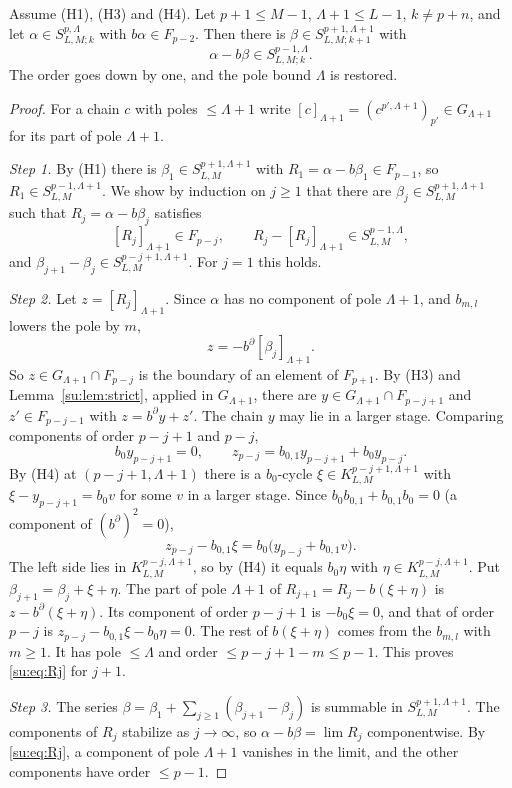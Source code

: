 \begin{proposition}
\label{su:prop:step}
Assume (H1), (H3) and (H4). Let \(p+1\le M-1\), \(\Lambda+1\le L-1\),
\(k\ne p+n\), and let \(\alpha\in S^{p,\Lambda}_{L,M;k}\) with
\(b\alpha\in F_{p-2}\). Then there is \(\beta\in
S^{p+1,\Lambda+1}_{L,M;k+1}\) with
\[
 \alpha-b\beta\in S^{p-1,\Lambda}_{L,M;k}.
\]
The order goes down by one, and the pole bound \(\Lambda\) is restored.
\end{proposition}

\begin{proof}
For a chain \(c\) with poles \(\le\Lambda+1\) write \([c]_{\Lambda+1}=
(c^{p',\Lambda+1})_{p'}\in G_{\Lambda+1}\) for its part of pole
\(\Lambda+1\).

\emph{Step 1.} By (H1) there is \(\beta_1\in S^{p+1,\Lambda+1}_{L,M}\)
with \(R_1=\alpha-b\beta_1\in F_{p-1}\), so \(R_1\in
S^{p-1,\Lambda+1}_{L,M}\). We show by induction on \(j\ge1\) that there
are \(\beta_j\in S^{p+1,\Lambda+1}_{L,M}\) such that
\(R_j=\alpha-b\beta_j\) satisfies
\begin{equation}\label{su:eq:Rj}
 [R_j]_{\Lambda+1}\in F_{p-j},\qquad R_j-[R_j]_{\Lambda+1}\in
 S^{p-1,\Lambda}_{L,M},
\end{equation}
and \(\beta_{j+1}-\beta_j\in S^{p-j+1,\Lambda+1}_{L,M}\). For \(j=1\)
this holds.

\emph{Step 2.} Let \(z=[R_j]_{\Lambda+1}\). Since \(\alpha\) has no
component of pole \(\Lambda+1\), and \(b_{m,l}\) lowers the pole by \(m\),
\[
 z=-b^\partial[\beta_j]_{\Lambda+1}.
\]
So \(z\in G_{\Lambda+1}\cap F_{p-j}\) is the boundary of an element of
\(F_{p+1}\). By (H3) and Lemma~\ref{su:lem:strict}, applied in
\(G_{\Lambda+1}\), there are \(y\in G_{\Lambda+1}\cap F_{p-j+1}\) and
\(z'\in F_{p-j-1}\) with \(z=b^\partial y+z'\). The chain \(y\) may lie in
a larger stage. Comparing components of order \(p-j+1\) and \(p-j\),
\[
 b_0y_{p-j+1}=0,\qquad z_{p-j}=b_{0,1}y_{p-j+1}+b_0y_{p-j}.
\]
By (H4) at \((p-j+1,\Lambda+1)\) there is a \(b_0\)-cycle \(\xi\in
K^{p-j+1,\Lambda+1}_{L,M}\) with \(\xi-y_{p-j+1}=b_0v\) for some \(v\) in
a larger stage. Since \(b_0b_{0,1}+b_{0,1}b_0=0\) (a component of
\((b^\partial)^2=0\)),
\[
 z_{p-j}-b_{0,1}\xi=b_0\bigl(y_{p-j}+b_{0,1}v\bigr).
\]
The left side lies in \(K^{p-j,\Lambda+1}_{L,M}\), so by (H4) it equals
\(b_0\eta\) with \(\eta\in K^{p-j,\Lambda+1}_{L,M}\). Put
\(\beta_{j+1}=\beta_j+\xi+\eta\). The part of pole \(\Lambda+1\) of
\(R_{j+1}=R_j-b(\xi+\eta)\) is \(z-b^\partial(\xi+\eta)\). Its component
of order \(p-j+1\) is \(-b_0\xi=0\), and that of order \(p-j\) is
\(z_{p-j}-b_{0,1}\xi-b_0\eta=0\). The rest of \(b(\xi+\eta)\) comes from
the \(b_{m,l}\) with \(m\ge1\). It has pole \(\le\Lambda\) and order
\(\le p-j+1-m\le p-1\). This proves \eqref{su:eq:Rj} for \(j+1\).

\emph{Step 3.} The series \(\beta=\beta_1+\sum_{j\ge1}(\beta_{j+1}-
\beta_j)\) is summable in \(S^{p+1,\Lambda+1}_{L,M}\). The components of
\(R_j\) stabilize as \(j\to\infty\), so \(\alpha-b\beta=\lim R_j\)
componentwise. By \eqref{su:eq:Rj}, a component of pole \(\Lambda+1\)
vanishes in the limit, and the other components have order \(\le p-1\).
\end{proof}

